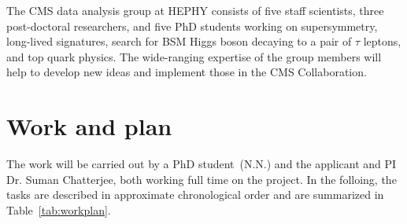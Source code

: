 \documentclass[a4paper,11pt]{article}
\begin{document}
The CMS data analysis group at HEPHY consists of five staff scientists, three post-doctoral researchers, and five PhD students working on supersymmetry, long-lived signatures, search for BSM Higgs boson decaying to a pair of $\tau$ leptons, and top quark physics. 
The wide-ranging expertise of the group members will help
to develop new ideas and implement those in the CMS Collaboration.

\section{Work and plan}

The work will be carried out by a PhD student~(N.N.) and the applicant and PI Dr. Suman Chatterjee, both working full time on the project. 
In the folloing, the tasks are described in approximate chronological order and are summarized in Table~\ref{tab:workplan}.%
\end{document}
